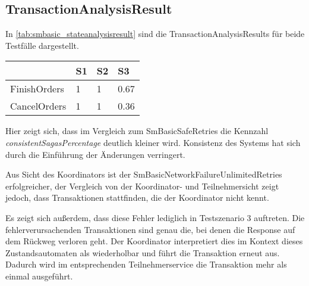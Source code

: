 \subsection{TransactionAnalysisResult}
In \cref{tab:smbasic_stateanalysisresult} sind die TransactionAnalysisResults für beide Testfälle dargestellt. 

\begin{center}
	\fontsize{9}{12}\selectfont
	\begin{longtable}[h]{|p{5cm}|p{1cm}|p{1cm}|p{1cm}|}
		\hline
		& S1 & S2 & S3 \\ \hline
		\endhead
		\endfoot
		FinishOrders & 1 & 1 & 0.67\\ \hline	
		CancelOrders & 1 & 1 & 0.36\\ \hline
	\end{longtable}
\end{center}
\FloatBarrier

Hier zeigt sich, dass im Vergleich zum SmBasicSafeRetries die Kennzahl \textit{consistentSagasPercentage} deutlich kleiner wird. Konsistenz des Systems hat sich durch die Einführung der Änderungen verringert. 

Aus Sicht des Koordinators ist der SmBasicNetworkFailureUnlimitedRetries erfolgreicher, der Vergleich von der Koordinator- und Teilnehmersicht zeigt jedoch, dass Transaktionen stattfinden, die der Koordinator nicht kennt. 

Es zeigt sich außerdem, dass diese Fehler lediglich in Testszenario 3 auftreten. Die fehlerverursachenden Transaktionen sind genau die, bei denen die Response auf dem Rückweg verloren geht. Der Koordinator interpretiert dies im Kontext dieses Zustandsautomaten als wiederholbar und führt die Transaktion erneut aus. Dadurch wird im entsprechenden Teilnehmerservice die Transaktion mehr als einmal ausgeführt. 